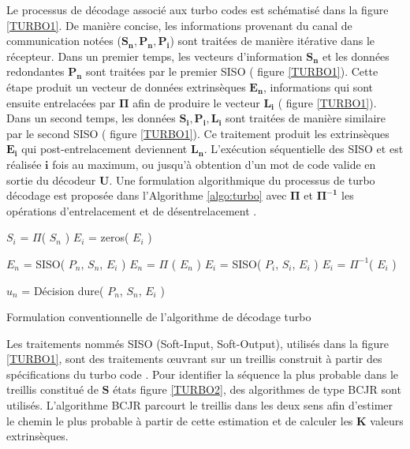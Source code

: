 \documentclass[../main.tex]{subfiles}
\begin{document}
Le processus de décodage associé aux turbo codes est schématisé dans la figure \ref{TURBO1}. De manière concise, les informations provenant du canal de communication notées ($\bm{S_n, P_n, P_i}$) sont traitées de manière itérative dans le récepteur. Dans un premier temps, les vecteurs d’information $\bm{S_n}$ et les données redondantes $\bm{P_n}$ sont traitées par le premier SISO ( figure \ref{TURBO1}). Cette étape produit un vecteur de données extrinsèques $\bm{E_n}$, informations qui sont ensuite entrelacées par $\bm{\Pi}$ afin de produire le vecteur $\bm{L_i}$ ( figure \ref{TURBO1}). Dans un second temps, les données $\bm{S_i, P_i, L_i}$ sont traitées de manière similaire par le second SISO ( figure \ref{TURBO1}). Ce traitement produit les extrinsèques $\bm{E_i}$ qui post-entrelacement deviennent $\bm{L_n}$. L’exécution séquentielle des SISO  et  est réalisée $\bm{i}$ fois au maximum, ou jusqu’à obtention d’un mot de code valide en sortie du décodeur $\bm{U}$. Une formulation algorithmique du processus de turbo décodage est proposée dans l’Algorithme \ref{algo:turbo} avec $\bm{\Pi}$ et $\bm{\Pi^{-1}}$ les opérations d’entrelacement et de désentrelacement \cite{TURBO:NEW:INTERL}.

\begin{algorithm}[tb]
    \small
    \begin{algorithmic}[1]
        \State $S_i$ = $\Pi$( $S_n$ )
        \State $E_i$ = zeros( $E_i$ )
        \item[]
        \State $E_n$ = SISO( $P_n$, $S_n$, $E_i$ )
        \State $E_n$ = $\Pi$ ( $E_n$ )
        \State $E_i$ = SISO( $P_i$, $S_i$, $E_i$ )
        \State $E_i$ = $\Pi^{-1}$( $E_i$ )
        \EndFor
        \item[]
        \State $u_n$ = Décision dure( $P_n$, $S_n$, $E_i$ )
        \end{algorithmic}
    \caption{Formulation conventionnelle de l'algorithme de décodage turbo}
    \label{algo:turbo}
\end{algorithm}


Les traitements nommés SISO (Soft-Input, Soft-Output), utilisés dans la figure \ref{TURBO1}, sont des traitements œuvrant sur un treillis construit à partir des spécifications du turbo code \cite{BookCodes}. Pour identifier la séquence la plus probable dans le treillis constitué de $\bm S$ états figure \ref{TURBO2}, des algorithmes de type BCJR  \cite{BCJR} sont utilisés. L'algorithme BCJR parcourt le treillis dans les deux sens afin d’estimer le chemin le plus probable à partir de cette estimation et de calculer les $\bm K$ valeurs extrinsèques.
\end{document}
